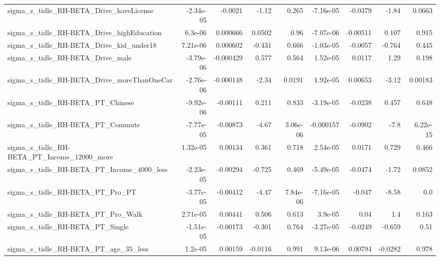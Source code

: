\begin{tabular}{lrrrrrrrr}
sigma\_s\_tidle\_RH-BETA\_Drive\_haveLicense            &   -2.34e-05 &      -0.0021 &     -1.12 &    0.265 &  -7.16e-05 &     -0.0379 &        -1.84 &        0.0663 \\
sigma\_s\_tidle\_RH-BETA\_Drive\_highEducation          &     6.3e-06 &     0.000666 &    0.0502 &     0.96 &  -7.07e-06 &    -0.00511 &        0.107 &         0.915 \\
sigma\_s\_tidle\_RH-BETA\_Drive\_kid\_under18            &    7.21e-06 &     0.000602 &    -0.431 &    0.666 &  -1.03e-05 &     -0.0057 &       -0.764 &         0.445 \\
sigma\_s\_tidle\_RH-BETA\_Drive\_male                   &   -3.79e-06 &    -0.000429 &     0.577 &    0.564 &   1.52e-05 &      0.0117 &         1.29 &         0.198 \\
sigma\_s\_tidle\_RH-BETA\_Drive\_moreThanOneCar         &   -2.76e-06 &    -0.000148 &     -2.34 &   0.0191 &   1.92e-05 &     0.00653 &        -3.12 &       0.00183 \\
sigma\_s\_tidle\_RH-BETA\_PT\_Chinese                   &   -9.92e-06 &     -0.00111 &     0.211 &    0.833 &  -3.19e-05 &     -0.0238 &        0.457 &         0.648 \\
sigma\_s\_tidle\_RH-BETA\_PT\_Commute                   &   -7.77e-05 &     -0.00873 &     -4.67 & 3.06e-06 &  -0.000157 &     -0.0902 &         -7.8 &      6.22e-15 \\
sigma\_s\_tidle\_RH-BETA\_PT\_Income\_12000\_more         &    1.32e-05 &      0.00134 &     0.361 &    0.718 &   2.54e-05 &      0.0171 &        0.729 &         0.466 \\
sigma\_s\_tidle\_RH-BETA\_PT\_Income\_4000\_less          &   -2.23e-05 &     -0.00294 &    -0.725 &    0.469 &  -5.49e-05 &     -0.0474 &        -1.72 &        0.0852 \\
sigma\_s\_tidle\_RH-BETA\_PT\_Pro\_PT                    &   -3.77e-05 &     -0.00412 &     -4.47 & 7.84e-06 &  -7.16e-05 &      -0.047 &        -8.58 &           0.0 \\
sigma\_s\_tidle\_RH-BETA\_PT\_Pro\_Walk                  &    2.71e-05 &      0.00441 &     0.506 &    0.613 &    3.9e-05 &        0.04 &          1.4 &         0.163 \\
sigma\_s\_tidle\_RH-BETA\_PT\_Single                    &   -1.51e-05 &     -0.00173 &    -0.301 &    0.764 &  -3.27e-05 &     -0.0249 &       -0.659 &          0.51 \\
sigma\_s\_tidle\_RH-BETA\_PT\_age\_35\_less               &     1.2e-05 &      0.00159 &   -0.0116 &    0.991 &   9.13e-06 &     0.00794 &      -0.0282 &         0.978 \\

\end{tabular}
